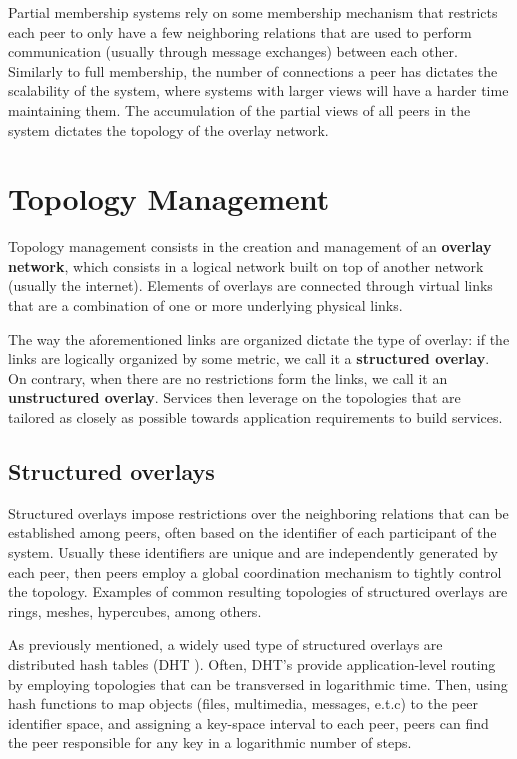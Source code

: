 
Partial membership systems rely on some membership mechanism that restricts each peer to only have a few neighboring relations that are used to perform communication (usually through message exchanges) between each other. Similarly to full membership, the number of connections a peer has  dictates the scalability of the system, where systems with larger views will have a harder time maintaining them. The accumulation of the partial views of all peers in the system dictates the topology of the overlay network.

\section{Topology Management}
\label{sec:topology_mgmt}

Topology management consists in the creation and management of an \textbf{overlay network}, which consists in a logical network built on top of another network (usually the internet). Elements of overlays are connected through virtual links that are a combination of one or more underlying physical links.

The way the aforementioned links are organized dictate the type of overlay: if the links are logically organized by some metric, we call it a \textbf{structured overlay}. On contrary, when there are no restrictions form the links, we call it an \textbf{unstructured overlay}. Services then leverage on the topologies that are tailored as closely as possible towards application requirements to build services.

\subsection{Structured overlays}

Structured overlays impose restrictions over the neighboring relations that can be established among peers, often based on the identifier of each participant of the system. Usually these identifiers are unique and are independently generated by each peer, then peers employ a global coordination mechanism to tightly control the topology. Examples of common resulting topologies of structured overlays are rings, meshes, hypercubes, among others.

As previously mentioned, a widely used type of structured overlays are distributed hash tables (DHT
). Often, DHT's provide application-level routing by employing topologies that can be transversed in logarithmic time. Then, using hash functions to map objects (files, multimedia, messages, e.t.c) to the peer identifier space, and assigning a key-space interval to each peer, peers can find the peer responsible for any key in a logarithmic number of steps. 

